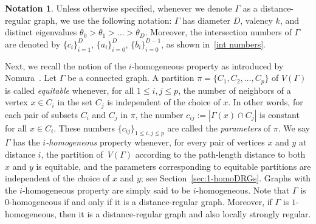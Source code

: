 \documentclass[11pt]{article}
\theoremstyle{definition}
\newtheorem{nota}[theo]{Notation}
\numberwithin{equation}{section}
\numberwithin{equation}{section}
\begin{document}
\begin{nota}
Unless otherwise specified, whenever we denote $\Gamma$ as a distance-regular graph, we use the following notation: $\Gamma$ has diameter $D$, valency $k$, and distinct eigenvalues $\theta_0 > \theta_1 > \ldots > \theta_D$. 
Moreover, the intersection numbers of $\Gamma$ are denoted by $\{c_i\}^D_{i=1}$, $\{a_i\}^D_{i=0}$, $\{b_i\}^{D-1}_{i=0}$, as shown in~\eqref{int numbers}.
\end{nota}

Next, we recall the notion of the $i$-homogeneous property as introduced by Nomura~\cite{Nomura1994}.
Let $\Gamma$ be a connected graph.
A partition $\pi = \{ C_1, C_2, \ldots, C_p \}$ of $V(\Gamma)$ is called \emph{equitable} whenever, for all $1 \leqslant i, j \leqslant p$, the number of neighbors of a vertex $x\in C_i$ in the set $C_j$ is independent of the choice of $x$.
In other words, for each pair of subsets $C_i$ and $C_j$ in $\pi$, the number $c_{ij} := | \Gamma(x) \cap C_j |$ is constant for all $x\in C_i$.  
These numbers $\{c_{ij}\}_{1\leqslant i,j \leqslant p}$ are called the \emph{parameters} of $\pi$.
We say $\Gamma$ has the \emph{$i$-homogeneous} property whenever, for every pair of vertices $x$ and $y$ at distance $i$, the partition of~$V(\Gamma)$ according to the path-length distance to both $x$ and $y$ is equitable, and the parameters corresponding to equitable partitions are independent of the choice of $x$ and $y$; see Section~\ref{sec:1-homoDRGs}. 
Graphs with the $i$-homogeneous property are simply said to be $i$-homogeneous.
Note that $\Gamma$ is $0$-homogeneous if and only if it is a distance-regular graph.
Moreover, if $\Gamma$ is $1$-homogeneous, then it is a distance-regular graph and also locally strongly regular.
\end{document}

